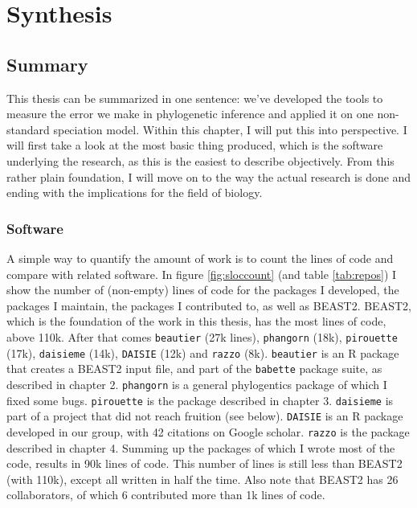 \chapter{Synthesis}
\label{synthesis}
\newpage

\noindent

\section{Summary}

This thesis can be summarized in one sentence:
we've developed the tools to measure the
error we make in phylogenetic inference and
applied it on one non-standard speciation model.
Within this chapter, I will put this into perspective.
I will first take a look at the most basic thing produced,
which is the software underlying the research,
as this is the easiest to describe objectively. 
From this rather plain foundation, I will move on 
to the way the actual research is done and ending
with the implications for the field of biology.

\subsection{Software}

A simple way to quantify the amount of work
is to count the lines of code and compare with related
software. In figure \ref{fig:sloccount} (and table \ref{tab:repos})
I show the number of
(non-empty) lines of code for the packages I developed, the packages
I maintain, the packages I contributed to, as well as BEAST2.
BEAST2, which is the foundation of the work in this thesis, 
has the most lines of code, above 110k. After that comes
\verb;beautier; (27k lines), \verb;phangorn; (18k), 
\verb;pirouette; (17k), \verb;daisieme; (14k), 
\verb;DAISIE; (12k) and \verb;razzo; (8k). 
\verb;beautier; is an R package that creates a BEAST2 
input file, and part of the \verb;babette; package suite, as described
in chapter 2. 
\verb;phangorn; is a general phylogentics package of which I fixed some bugs.
\verb;pirouette; is the package described in chapter 3. 
\verb;daisieme; is part of a project that did not reach fruition (see below).
\verb;DAISIE; is an R package developed in our group, with 42 citations on
Google scholar. \verb;razzo; is the package described in chapter 4.
Summing up the packages of which I wrote most of the code, results
in 90k lines of code. This number of lines is still less than 
BEAST2 (with 110k), except all written in half the time. Also note that
BEAST2 has 26 collaborators, of which 6 contributed more than 1k lines of code.

